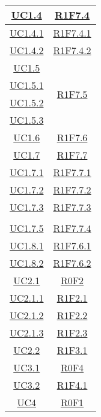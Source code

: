 \begin{longtable}{|c|c|}
	\hline
	\hyperlink{UC1.4}{UC1.4} & \hyperlink{R1F7.4}{R1F7.4} \\
	\hline
	\hyperlink{UC1.4.1}{UC1.4.1} & \hyperlink{R1F7.4.1}{R1F7.4.1}\\
	\hline
	\hyperlink{UC1.4.2}{UC1.4.2} & \hyperlink{R1F7.4.2}{R1F7.4.2}\\
	\hline
	\hyperlink{UC1.5}{UC1.5} & \multirow{4}{*}{\hyperlink{R1F7.5}{R1F7.5}}\\
	\hyperlink{UC1.5.1}{UC1.5.1} &\\
	\hyperlink{UC1.5.2}{UC1.5.2} &\\
	\hyperlink{UC1.5.3}{UC1.5.3} &\\
	\hline
	\hyperlink{UC1.6}{UC1.6} & \hyperlink{R1F7.6}{R1F7.6} \\
	\hline
	\hyperlink{UC1.7}{UC1.7} & \hyperlink{R1F7.7}{R1F7.7}\\
	\hline
	\hyperlink{UC1.7.1}{UC1.7.1} & \hyperlink{R1F7.7.1}{R1F7.7.1} \\
	\hline
	\hyperlink{UC1.7.2}{UC1.7.2} & \hyperlink{R1F7.7.2}{R1F7.7.2} \\
	\hline
	\hyperlink{UC1.7.3}{UC1.7.3} & \hyperlink{R1F7.7.3}{R1F7.7.3}\\
	\hline
	\begin{tabular}{c}
		\hyperlink{UC1.7.4}{UC1.7.4} \\ \hyperlink{UC1.7.5}{UC1.7.5}
	\end{tabular} & \hyperlink{R1F7.7.4}{R1F7.7.4}\\
	\hline
	\hyperlink{UC1.8.1}{UC1.8.1} & \hyperlink{R1F7.6.1}{R1F7.6.1} \\
	\hline
	\hyperlink{UC1.8.2}{UC1.8.2} & \hyperlink{R1F7.6.2}{R1F7.6.2} \\
	\hline
	\hyperlink{UC2.1}{UC2.1} & \hyperlink{R0F2}{R0F2}\\
	\hline
	\hyperlink{UC2.1.1}{UC2.1.1} & \hyperlink{R1F2.1}{R1F2.1}\\
	\hline
	\hyperlink{UC2.1.2}{UC2.1.2} & \hyperlink{R1F2.2}{R1F2.2}\\
	\hline
	\hyperlink{UC2.1.3}{UC2.1.3} & \hyperlink{R1F2.3}{R1F2.3}\\
	\hline
	\hyperlink{UC2.2}{UC2.2} & \hyperlink{R1F3.1}{R1F3.1}\\
	\hline
	\hyperlink{UC3.1}{UC3.1} & \hyperlink{R0F4}{R0F4}\\
	\hline
	\hyperlink{UC3.2}{UC3.2} & \hyperlink{R1F4.1}{R1F4.1}\\
	\hline
	\hyperlink{UC4}{UC4} & \hyperlink{R0F1}{R0F1}\\
	\hline

\end{longtable}
